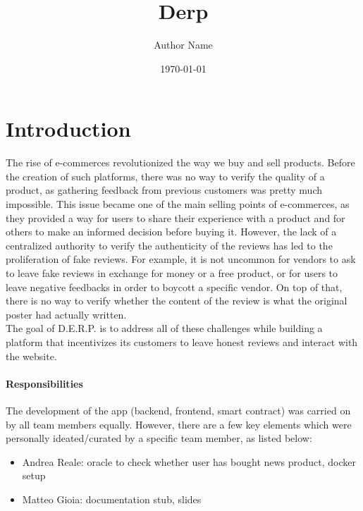 \documentclass[12pt,a4paper,oneside]{article}
\title{Derp}	                                    %
\author{Author Name}				                %
\date{\today}									    %
\theoremstyle{definition}
\begin{document}

\newpage
\tableofcontents
\newpage




\section{Introduction}

The rise of e-commerces revolutionized the way we buy and sell products. Before the creation of such platforms, there was no way to verify the quality of a product, as gathering feedback from previous customers was pretty much impossible.
This issue became one of the main selling points of e-commerces, as they provided a way for users to share their experience with a product and for others to make an informed decision before buying it.
However, the lack of a centralized authority to verify the authenticity of the reviews has led to the proliferation of fake reviews. For example, it is not uncommon for vendors to ask to leave fake reviews in exchange for money or a free product, or for users to leave negative feedbacks in order to boycott a specific vendor. On top of that, there is no way to verify whether the content of the review is what the original poster had actually written. \\
The goal of D.E.R.P. is to address all of these challenges while building a platform that incentivizes its customers to leave honest reviews and interact with the website.

\paragraph{Responsibilities} The development of the app (backend, frontend, smart contract) was carried on by all team members equally. However, there are a few key elements which were personally ideated/curated by a specific team member, as listed below:
\begin{itemize}
	\item Andrea Reale: oracle to check whether user has bought news product, docker setup
	\item Matteo Gioia: documentation stub, slides
\end{itemize}
\end{document}
